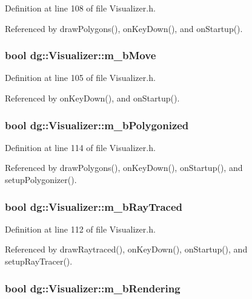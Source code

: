 Definition at line 108 of file Visualizer.h.

Referenced by draw\-Polygons(), on\-Key\-Down(), and on\-Startup().
\subsubsection{\setlength{\rightskip}{0pt plus 5cm}bool dg::Visualizer::m\_\-b\-Move\hspace{0.3cm}{\tt  [protected]}}\label{classdg_1_1Visualizer_n11}




Definition at line 105 of file Visualizer.h.

Referenced by on\-Key\-Down(), and on\-Startup().
\subsubsection{\setlength{\rightskip}{0pt plus 5cm}bool dg::Visualizer::m\_\-b\-Polygonized\hspace{0.3cm}{\tt  [protected]}}\label{classdg_1_1Visualizer_n16}




Definition at line 114 of file Visualizer.h.

Referenced by draw\-Polygons(), on\-Key\-Down(), on\-Startup(), and setup\-Polygonizer().
\subsubsection{\setlength{\rightskip}{0pt plus 5cm}bool dg::Visualizer::m\_\-b\-Ray\-Traced\hspace{0.3cm}{\tt  [protected]}}\label{classdg_1_1Visualizer_n14}




Definition at line 112 of file Visualizer.h.

Referenced by draw\-Raytraced(), on\-Key\-Down(), on\-Startup(), and setup\-Ray\-Tracer().
\subsubsection{\setlength{\rightskip}{0pt plus 5cm}bool dg::Visualizer::m\_\-b\-Rendering\hspace{0.3cm}{\tt  [protected]}}\label{classdg_1_1Visualizer_n13}




